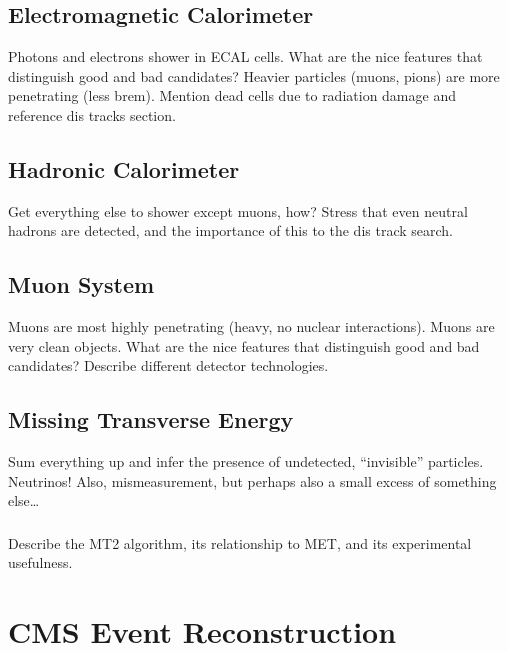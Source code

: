   \subsection{Electromagnetic Calorimeter} \label{sec:ecal}

  Photons and electrons shower in ECAL cells.
  What are the nice features that distinguish good and bad candidates?
  Heavier particles (muons, pions) are more penetrating (less brem).
  Mention dead cells due to radiation damage and reference dis tracks section.

  \subsection{Hadronic Calorimeter} \label{sec:hcal}

  Get everything else to shower except muons, how?  
  Stress that even neutral hadrons are detected, and the importance of this to the dis track search.

  \subsection{Muon System} \label{sec:muon}

  Muons are most highly penetrating (heavy, no nuclear interactions).
  Muons are very clean objects.
  What are the nice features that distinguish good and bad candidates?
  Describe different detector technologies.

  \subsection{Missing Transverse Energy} \label{sec:MET}

  Sum everything up and infer the presence of undetected, ``invisible'' particles.
  Neutrinos! 
  Also, mismeasurement, but perhaps also a small excess of something else\ldots

    \subsubsection{\mttwo} \label{sec:MT2}

    Describe the MT2 algorithm, its relationship to MET, and its experimental usefulness.

\section{CMS Event Reconstruction} \label{sec:reconstruction}


